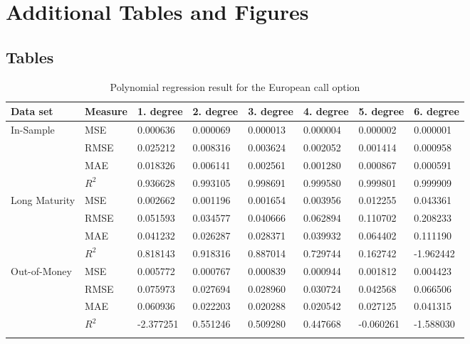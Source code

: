 
\chapter{Additional Tables and Figures} %

\label{AppendixD} %

\section{Tables}

\begin{table}[H]
\caption{Polynomial regression result for the European call option}
\label{tab:fullEuroCall}
\centering
\begin{tabular}{llllllll}
\toprule
\textbf{Data set} &  \textbf{Measure} & \textbf{1. degree} & \textbf{2. degree} & \textbf{3. degree} & {4. degree} & \textbf{5. degree} & {6. degree}\\
\midrule
In-Sample     &	MSE  & 0.000636 & 0.000069 & 0.000013 & 0.000004 & 0.000002 & 0.000001 \\
		      & RMSE & 0.025212 & 0.008316 & 0.003624 & 0.002052 & 0.001414 & 0.000958 \\
		      & MAE  & 0.018326 & 0.006141 & 0.002561 & 0.001280 & 0.000867 & 0.000591 \\
		      & $R^2$& 0.936628 & 0.993105 & 0.998691 & 0.999580 & 0.999801 & 0.999909 \\
Long Maturity & MSE  & 0.002662 & 0.001196 & 0.001654 & 0.003956 & 0.012255 & 0.043361 \\
		      & RMSE & 0.051593 & 0.034577 & 0.040666 & 0.062894 & 0.110702 & 0.208233 \\
		      & MAE  & 0.041232 & 0.026287 & 0.028371 & 0.039932 & 0.064402 & 0.111190 \\
		      & $R^2$& 0.818143 & 0.918316 & 0.887014 & 0.729744 & 0.162742 & -1.962442 \\
Out-of-Money  & MSE  & 0.005772 & 0.000767 & 0.000839 & 0.000944 & 0.001812 & 0.004423 \\
		      & RMSE & 0.075973 & 0.027694 & 0.028960 & 0.030724 & 0.042568 & 0.066506 \\
		      & MAE  & 0.060936 & 0.022203 & 0.020288 & 0.020542 & 0.027125 & 0.041315\\
		      & $R^2$& -2.377251 & 0.551246 & 0.509280 & 0.447668 & -0.060261 & -1.588030\\
\bottomrule\\
\end{tabular}
\end{table}


